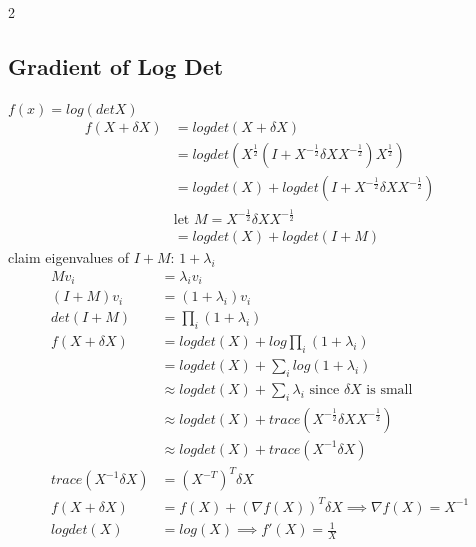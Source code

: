 \documentclass[8pt]{extarticle}
\begin{document}
\begin{multicols*}{2}
  \subsection{Gradient of Log Det}
  $f(x)=log(det X)$\\
  \begin{align*}
    f(X+\delta X) &= logdet(X+\delta X)\\
                  &= logdet(X^{\frac{1}{2}}(I+X^{-\frac{1}{2}} \delta X X^{-\frac{1}{2}})X^{\frac{1}{2}})\\
                  &= logdet(X)+logdet(I+X^{-\frac{1}{2}} \delta X X^{-\frac{1}{2}})\\
                  & \text{let } M = X^{-\frac{1}{2}} \delta X X^{-\frac{1}{2}}\\
                  &= logdet(X)+logdet(I+M)
  \end{align*}
  claim eigenvalues of $I+M$: $1+\lambda_i$
  \begin{align*}
    Mv_i &= \lambda_i v_i\\
    (I+M)v_i &= (1+\lambda_i)v_i\\
    det(I+M)&=\prod_i(1+\lambda_i)\\
    f(X+\delta X) &= logdet(X) + log \prod_i(1+\lambda_i)\\
         &= logdet(X) + \sum_i log(1+\lambda_i)\\
         &\approx logdet(X) + \sum_i \lambda_i \text{ since } \delta X \text{ is small}\\
         &\approx logdet(X) + trace(X^{-\frac{1}{2}} \delta X X^{-\frac{1}{2}})\\
         &\approx logdet(X) + trace(X^{-1} \delta X)\\
    trace(X^{-1} \delta X) &= (X^{-T})^T \delta X\\
    f(X+\delta X) &= f(X) + (\nabla f(X))^T \delta X \implies \nabla f(X) = X^{-1}\\
    logdet(X) &= log(X) \implies f'(X)=\frac{1}{X}
  \end{align*}
    

\end{multicols*}
\end{document}
